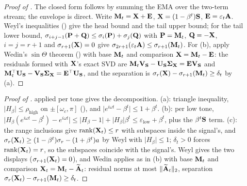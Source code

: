 \documentclass[11pt,a4paper]{article}
\theoremstyle{remark}
\newcommand{\rhohigh}{\rho_{\mathrm{high}}}
\newcommand{\epslow}{\varepsilon_{\mathrm{low}}}
\begin{document}
\begin{proof}[Proof of ]
The closed form follows by summing the EMA over the two-term stream; the envelope is direct.
Write $\mathbf{M}_t=\mathbf{X}+\mathbf{E}$, $\mathbf{X}=(1-\beta^t)\mathbf{S}$, $\mathbf{E}=\varepsilon_t\mathbf{A}$.
Weyl's inequalities () give the head bound and the tail upper bound; for the tail lower bound, $\sigma_{i+j-1}(\mathbf{P}+\mathbf{Q})\le\sigma_i(\mathbf{P})+\sigma_j(\mathbf{Q})$ with $\mathbf{P}=\mathbf{M}_t$, $\mathbf{Q}=-\mathbf{X}$, $i=j=r+1$ and $\sigma_{r+1}(\mathbf{X})=0$ give $\sigma_{2r+1}(\varepsilon_t\mathbf{A})\le\sigma_{r+1}(\mathbf{M}_t)$.
For (b), apply Wedin's $\sin\Theta$ theorem () with base $\mathbf{M}_t$ and comparison $\mathbf{X}=\mathbf{M}_t-\mathbf{E}$: the residuals formed with $\mathbf{X}$'s exact SVD are $\mathbf{M}_t\mathbf{V}_{\mathbf{S}}-\mathbf{U}_{\mathbf{S}}\bm{\Sigma}_{\mathbf{X}}=\mathbf{E}\mathbf{V}_{\mathbf{S}}$ and $\mathbf{M}_t^\top\mathbf{U}_{\mathbf{S}}-\mathbf{V}_{\mathbf{S}}\bm{\Sigma}_{\mathbf{X}}=\mathbf{E}^\top\mathbf{U}_{\mathbf{S}}$, and the separation is $\sigma_r(\mathbf{X})-\sigma_{r+1}(\mathbf{M}_t)\ge\delta_t$ by (a).
\end{proof}

\begin{proof}[Proof of ]
 applied per tone gives the decomposition.
(a): triangle inequality, $\lvert H_\beta\rvert\le\rhohigh$ on $\pm[\omega_c,\pi]$ (), and $\lvert e^{i\omega t}-\beta^t\rvert\le1+\beta^t$.
(b): per low tone, $\lvert H_\beta(e^{i\omega t}-\beta^t)-e^{i\omega t}\rvert\le\lvert H_\beta-1\rvert +\lvert H_\beta\rvert\beta^t\le\epslow+\beta^t$, plus the $\beta^t\mathbf{S}$ term.
(c): the range inclusions give $\mathrm{rank}(\mathbf{X}_t)\le r$ with subspaces inside the signal's, and $\sigma_r(\mathbf{X}_t)\ge(1-\beta^t)\sigma_r-(1+\beta^t)a$ by Weyl with $\lvert H_\beta\rvert\le1$; $\delta_t>0$ forces $\mathrm{rank}(\mathbf{X}_t)=r$, so the subspaces coincide with the signal's.
Weyl gives the two displays ($\sigma_{r+1}(\mathbf{X}_t)=0$), and Wedin applies as in (b) with base $\mathbf{M}_t$ and comparison $\mathbf{X}_t=\mathbf{M}_t-\widetilde{\mathbf{A}}_t$: residual norms at most $\lVert\widetilde{\mathbf{A}}_t\rVert_2$, separation $\sigma_r(\mathbf{X}_t)-\sigma_{r+1}(\mathbf{M}_t)\ge\delta_t$.
\end{proof}
\end{document}
